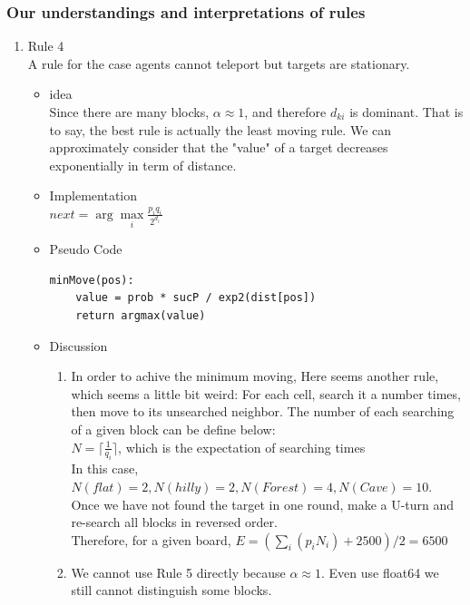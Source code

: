 \documentclass[letter]{article}
\begin{document}
\subsubsection{Our understandings and interpretations of rules}
\begin{enumerate}
	\item {Rule 4} \\
	A rule for the case agents cannot teleport but targets are stationary.
	\begin{itemize}
		\item {idea} \\
		Since there are many blocks, $\alpha \approx 1$, and therefore $d_{ki}$ is dominant. That is to say, the best rule is actually the least moving rule. We can approximately consider that the "value" of a target decreases exponentially in term of distance.
		\item {Implementation} \\
		$next = \arg\max\limits_i \frac{p_iq_i}{2^{d_i}}$
		\item {Pseudo Code} 
		\begin{lstlisting}
minMove(pos):
	value = prob * sucP / exp2(dist[pos])
	return argmax(value)
		\end{lstlisting}
		\item {Discussion} 
		\begin{enumerate}
			\item {In order to achive the minimum moving, Here seems another rule, which seems a little bit weird: For each cell, search it a number times, then move to its unsearched neighbor. The number of each searching of a given block can be define below: \\
			$N = \lceil\frac{1}{q_i}\rceil$, which is the expectation of searching times\\
			In this case, $N(flat) = 2, N(hilly) = 2, N(Forest) = 4, N(Cave) = 10$.\\ Once we have not found the target in one round, make a U-turn and re-search all blocks in reversed order.\\
			Therefore, for a given board, $E = (\sum\limits_i (p_iN_i) + 2500)/2 = 6500$}
			\item {We cannot use Rule 5 directly because $\alpha \approx 1$. Even use float64 we still cannot distinguish some blocks.}
		\end{enumerate}
	\end{itemize}
	

\end{enumerate}
\end{document}
